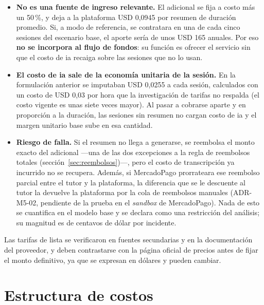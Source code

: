 \begin{itemize}
    \item \textbf{No es una fuente de ingreso relevante.} El adicional se
          fija a costo más un 50\,\%, y deja a la plataforma USD 0,0945
          por resumen de duración promedio. Si, a modo de referencia, se
          contratara en una de cada cinco sesiones del escenario base, el
          aporte sería de unos USD 165 anuales. Por eso
          \textbf{no se incorpora al flujo de fondos}: su función es
          ofrecer el servicio sin que el costo de \gls{ia} recaiga sobre
          las sesiones que no lo usan.
    \item \textbf{El costo de \gls{ia} sale de la economía unitaria de la
          sesión.} En la formulación anterior se imputaban USD 0,0255 a
          cada sesión, calculados con un costo de USD 0,03 por hora que la
          investigación de tarifas no respalda (el costo vigente es unas
          siete veces mayor). Al pasar a cobrarse aparte y en proporción
          a la duración, las sesiones sin resumen no cargan costo de
          \gls{ia} y el margen unitario base sube en esa cantidad.
    \item \textbf{Riesgo de falla.} Si el resumen no llega a generarse, se
          reembolsa el monto exacto del adicional —una de las dos
          excepciones a la regla de reembolsos totales
          (sección~\ref{sec:reembolsos})—, pero el costo de transcripción
          ya incurrido no se recupera. Además, si MercadoPago prorrateara
          ese reembolso parcial entre el tutor y la plataforma, la
          diferencia que se le descuente al tutor la devuelve la
          plataforma por la cola de reembolsos manuales (ADR-M5-02,
          pendiente de la prueba en el \emph{sandbox} de MercadoPago).
          Nada de esto se cuantifica en el modelo base y se declara como
          una restricción del análisis; su magnitud es de centavos de dólar
          por incidente.
\end{itemize}

Las tarifas de lista se verificaron en fuentes secundarias y en la
documentación del proveedor, y deben contrastarse con la página oficial de
precios antes de fijar el monto definitivo, ya que se expresan en dólares y
pueden cambiar.

\section{Estructura de costos}

